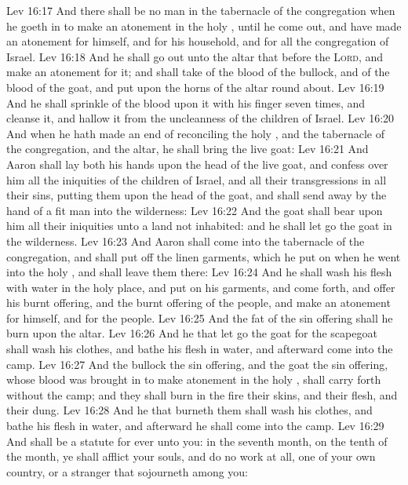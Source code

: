 \vs Lev 16:17 And there shall be no man in the tabernacle of the congregation when he goeth in to make an atonement in the holy , until he come out, and have made an atonement for himself, and for his household, and for all the congregation of Israel.
\vs Lev 16:18 And he shall go out unto the altar that  before the \textsc{Lord}, and make an atonement for it; and shall take of the blood of the bullock, and of the blood of the goat, and put  upon the horns of the altar round about.
\vs Lev 16:19 And he shall sprinkle of the blood upon it with his finger seven times, and cleanse it, and hallow it from the uncleanness of the children of Israel.
\vs Lev 16:20 And when he hath made an end of reconciling the holy , and the tabernacle of the congregation, and the altar, he shall bring the live goat:
\vs Lev 16:21 And Aaron shall lay both his hands upon the head of the live goat, and confess over him all the iniquities of the children of Israel, and all their transgressions in all their sins, putting them upon the head of the goat, and shall send  away by the hand of a fit man into the wilderness:
\vs Lev 16:22 And the goat shall bear upon him all their iniquities unto a land not inhabited: and he shall let go the goat in the wilderness.
\vs Lev 16:23 And Aaron shall come into the tabernacle of the congregation, and shall put off the linen garments, which he put on when he went into the holy , and shall leave them there:
\vs Lev 16:24 And he shall wash his flesh with water in the holy place, and put on his garments, and come forth, and offer his burnt offering, and the burnt offering of the people, and make an atonement for himself, and for the people.
\vs Lev 16:25 And the fat of the sin offering shall he burn upon the altar.
\vs Lev 16:26 And he that let go the goat for the scapegoat shall wash his clothes, and bathe his flesh in water, and afterward come into the camp.
\vs Lev 16:27 And the bullock  the sin offering, and the goat  the sin offering, whose blood was brought in to make atonement in the holy , shall  carry forth without the camp; and they shall burn in the fire their skins, and their flesh, and their dung.
\vs Lev 16:28 And he that burneth them shall wash his clothes, and bathe his flesh in water, and afterward he shall come into the camp.
\vs Lev 16:29 And  shall be a statute for ever unto you:  in the seventh month, on the tenth  of the month, ye shall afflict your souls, and do no work at all,  one of your own country, or a stranger that sojourneth among you:
